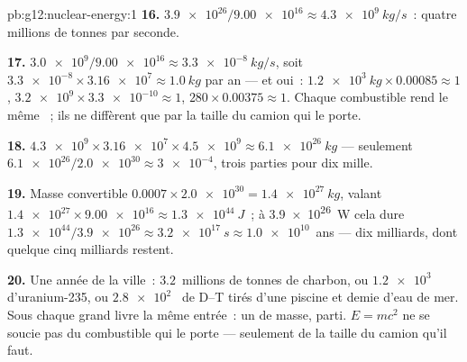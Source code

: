 \begin{solution}{pb:g12:nuclear-energy:1}
\textbf{16.} $\num{3.9e26}/\num{9.00e16} \approx \qty{4.3e9}{kg/s}$~:
quatre millions de tonnes par seconde.

\textbf{17.} $\num{3.0e9}/\num{9.00e16} \approx \qty{3.3e-8}{kg/s}$,
soit $\num{3.3e-8} \times \num{3.16e7} \approx \qty{1.0}{kg}$ par an
--- et oui~: $\qty{1.2e3}{kg} \times 0.00085 \approx 1$, $\num{3.2e9}
\times \num{3.3e-10} \approx 1$, $280 \times 0.00375 \approx 1$. Chaque
combustible rend le même ~; ils ne
diffèrent que par la taille du camion qui le porte.

\textbf{18.} $\num{4.3e9} \times \num{3.16e7} \times \num{4.5e9}
\approx \qty{6.1e26}{kg}$ --- seulement $\num{6.1e26}/\num{2.0e30}
\approx \num{3e-4}$, trois parties pour dix mille.

\textbf{19.} Masse convertible $0.0007 \times \num{2.0e30} =
\qty{1.4e27}{kg}$, valant $\num{1.4e27} \times \num{9.00e16} \approx
\qty{1.3e44}{J}$~; à \qty{3.9e26}{W} cela dure $\num{1.3e44}/
\num{3.9e26} \approx \qty{3.2e17}{s} \approx \num{1.0e10}$~ans --- dix
milliards, dont quelque cinq milliards restent.

\textbf{20.} Une année de la ville~: $3.2$~millions de tonnes de
charbon, ou $\num{1.2e3}$~
d'uranium-235, ou $\num{2.8e2}$~ de
D--T tirés d'une piscine et demie d'eau de mer. Sous chaque grand
livre la même entrée~: un  de masse,
parti. $E = mc^2$ ne se soucie pas du combustible qui le porte ---
seulement de la taille du camion qu'il faut.
\end{solution}
